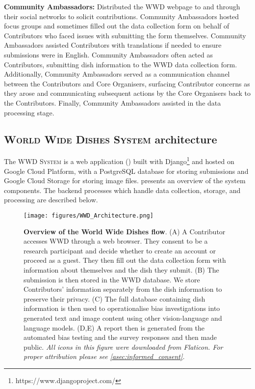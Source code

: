 \textbf{Community Ambassadors:} Distributed the \textsc{WWD} webpage to and through their social networks to solicit contributions. Community Ambassadors hosted focus groups and sometimes filled out the data collection form on behalf of Contributors who faced issues with submitting the form themselves. Community Ambassadors assisted Contributors with translations if needed to ensure submissions were in English. Community Ambassadors often acted as Contributors, submitting dish information to the \textsc{WWD} data collection form. Additionally, Community Ambassadors served as a communication channel between the Contributors and Core Organisers, surfacing Contributor concerns as they arose and communicating subsequent actions by the Core Organisers back to the Contributors. Finally, Community Ambassadors assisted in the data processing stage.


\subsection{{\textsc{World Wide Dishes System}} architecture}
The \textsc{WWD System} is a web application () built with Django\footnote{https://www.djangoproject.com/} and hosted on Google Cloud Platform, with a PostgreSQL database for storing submissions and Google Cloud Storage for storing image files.  presents an overview of the system components. The backend processes which handle data collection, storage, and processing are described below.

\begin{figure}[t]
    \centering
    \texttt{[image: figures/WWD\_Architecture.png]}
    \caption{\textbf{Overview of the World Wide Dishes flow}. (A) A Contributor accesses \textsc{WWD} through a web browser. They consent to be a research participant and decide whether to create an account or proceed as a guest. They then fill out the data collection form with information about themselves and the dish they submit.  (B) The submission is then stored in the \textsc{WWD} database. We store Contributors' information separately from the dish information to preserve their privacy. (C) The full database containing dish information is then used to operationalise bias investigations into generated text and image content using other vision-language and language models. (D,E) A report then is generated from the automated bias testing and the survey responses and then made public. \textit{All icons in this figure were downloaded from Flaticon. For proper attribution please see \ref{asec:informed_consent}.}} 
    \label{fig:WWD Architecture}
\end{figure}

